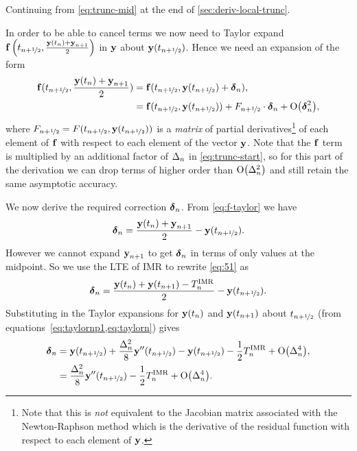 Continuing from \cref{eq:trunc-mid} at the end of \cref{sec:deriv-local-trunc}.

In order to be able to cancel terms we now need to Taylor expand ${\boldsymbol{\mathrm{f}}}\left( t_{n+\nicefrac{1}{2}}, \frac{\boldsymbol{\mathrm{y}}(t_n) + \boldsymbol{\mathrm{y}}_{n+1}}{2} \right)$ in $\boldsymbol{\mathrm{y}}$ about $\boldsymbol{\mathrm{y}}(t_{n+\nicefrac{1}{2}})$.
Hence we need an expansion of the form
\begin{equation}
  \begin{aligned}
    \fv(\thf, \frac{\yv(t_n) + \yv_{n+1}}{2}) &= \fv(\thf, \yvhf + \dyn), \\
    &= \fv(\thf, \yvhf) + \dfdyhf \cdot \dyn  + \order{\dyn^2},
    \label{eq:f-taylor}
  \end{aligned}
\end{equation}
where $F_{n+\nicefrac{1}{2}} = F(t_{n+\nicefrac{1}{2}}, \boldsymbol{\mathrm{y}}(t_{n+\nicefrac{1}{2}}))$ is a \emph{matrix} of partial derivatives\footnote{Note that this is \emph{not} equivalent to the Jacobian matrix associated with the Newton-Raphson method which is the derivative of the residual function with respect to each element of $\boldsymbol{\mathrm{y}}$.} of each element of ${\boldsymbol{\mathrm{f}}}$ with respect to each element of the vector $\boldsymbol{\mathrm{y}}$.
Note that the ${\boldsymbol{\mathrm{f}}}$ term is multiplied by an additional factor of $\Delta_{n}$ in \cref{eq:trunc-start}, so for this part of the derivation we can drop terms of higher order than $\mathrm{O}{\left( \Delta_{n}^2 \right)}$ and still retain the same asymptotic accuracy.

We now derive the required correction $\mbox{\boldmath$\delta$}_{n}$.
From \cref{eq:f-taylor} we have
\begin{equation}
  \dyn = \frac{\yv(t_n) + \yv_{n+1}}{2} - \yvhf.
  \label{eq:51}
\end{equation}
However we cannot expand $\boldsymbol{\mathrm{y}}_{n+1}$ to get $\mbox{\boldmath$\delta$}_{n}$ in terms of only values at the midpoint.
So we use the LTE of IMR to rewrite \cref{eq:51} as
\begin{equation}
  \mbox{\boldmath$\delta$}_{n} = \frac{\boldsymbol{\mathrm{y}}(t_n) + \boldsymbol{\mathrm{y}}(t_{n+1}) - T_n^{\mathrm{IMR}}}{2} - \boldsymbol{\mathrm{y}}(t_{n+\nicefrac{1}{2}}).
\end{equation}
Substituting in the Taylor expansions for $\boldsymbol{\mathrm{y}}(t_n)$ and $\boldsymbol{\mathrm{y}}(t_{n+1})$ about $t_{n+\nicefrac{1}{2}}$ (from equations~\cref{eq:taylornp1,eq:taylorn}) gives
\begin{equation}
  \begin{aligned}
    \dyn &= \yvhf + \frac{\dtn^2}{8} \yvhf[''] - \yvhf - \frac{1}{2} \lte^\imr + \order{\dtn^4},\\
    &= \frac{\dtn^2}{8} \yvhf[''] - \frac{1}{2} \lte^\imr + \order{\dtn^4}.
    \label{eq:dy-value}
  \end{aligned}
\end{equation}


